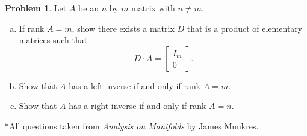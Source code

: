 \documentclass{amsart}
\newcommand{\+}[1]{\ensuremath{\mathbf{#1}}}
\theoremstyle{definition}
\newtheorem{prob}{Problem}
\begin{document}
\begin{prob}
 Let $A$ be an $n$ by $m$ matrix with $n \neq m$.
 \begin{enumerate}[(a)]
  \item If rank $A = m$, show there
  exists a matrix $D$ that is a product
  of elementary matrices such that 
  \[
D \cdot A = \begin{bmatrix}
I_m \\ 0
\end{bmatrix}.
  \]
  \item Show that $A$ has a left inverse
  if and only if rank $A = m$.
  \item Show that $A$
  has a right inverse if and only if
  rank $A = n$.
 \end{enumerate}
\end{prob}





\vspace{5mm}

*All questions taken from \emph{Analysis on Manifolds} by James Munkres.
\end{document}
